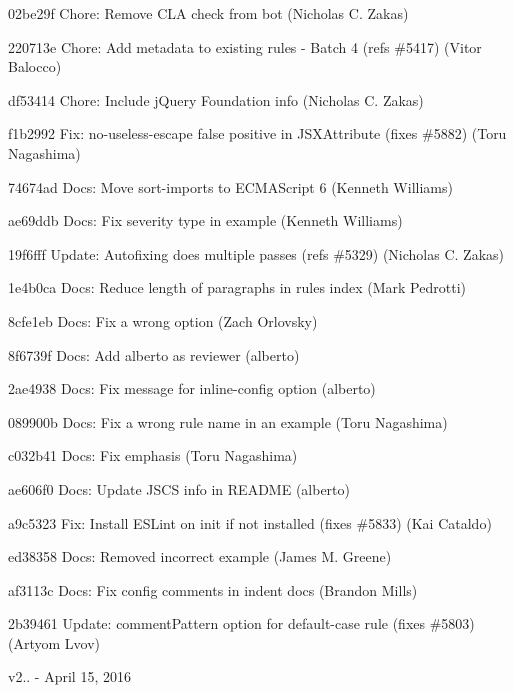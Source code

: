 \begin{DoxyItemize}
\item 02be29f Chore\+: Remove C\+LA check from bot (Nicholas C. Zakas)
\item 220713e Chore\+: Add metadata to existing rules -\/ Batch 4 (refs \#5417) (Vitor Balocco)
\item df53414 Chore\+: Include j\+Query Foundation info (Nicholas C. Zakas)
\item f1b2992 Fix\+: {\ttfamily no-\/useless-\/escape} false positive in J\+S\+X\+Attribute (fixes \#5882) (Toru Nagashima)
\item 74674ad Docs\+: Move {\ttfamily sort-\/imports} to \textquotesingle{}E\+C\+M\+A\+Script 6\textquotesingle{} (Kenneth Williams)
\item ae69ddb Docs\+: Fix severity type in example (Kenneth Williams)
\item 19f6fff Update\+: Autofixing does multiple passes (refs \#5329) (Nicholas C. Zakas)
\item 1e4b0ca Docs\+: Reduce length of paragraphs in rules index (Mark Pedrotti)
\item 8cfe1eb Docs\+: Fix a wrong option (Zach Orlovsky)
\item 8f6739f Docs\+: Add alberto as reviewer (alberto)
\item 2ae4938 Docs\+: Fix message for {\ttfamily inline-\/config} option (alberto)
\item 089900b Docs\+: Fix a wrong rule name in an example (Toru Nagashima)
\item c032b41 Docs\+: Fix emphasis (Toru Nagashima)
\item ae606f0 Docs\+: Update J\+S\+CS info in R\+E\+A\+D\+ME (alberto)
\item a9c5323 Fix\+: Install E\+S\+Lint on init if not installed (fixes \#5833) (Kai Cataldo)
\item ed38358 Docs\+: Removed incorrect example (James M. Greene)
\item af3113c Docs\+: Fix config comments in indent docs (Brandon Mills)
\item 2b39461 Update\+: {\ttfamily comment\+Pattern} option for {\ttfamily default-\/case} rule (fixes \#5803) (Artyom Lvov)
\end{DoxyItemize}

v2.. -\/ April 15, 2016


